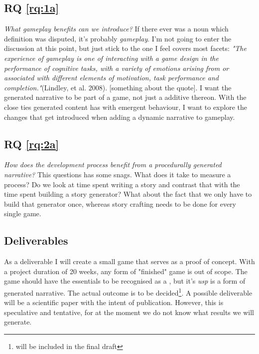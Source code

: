 \subsection{RQ \ref{rq:1a}}
\textit{What gameplay benefits can we introduce?}
If there ever was a noun which definition was disputed, it's probably \textit{gameplay}. I'm not going to enter the discussion at this point, but just stick to the one I feel covers most facets: \textit{"The experience of gameplay is one of interacting with a game design in the performance of cognitive tasks, with a variety of emotions arising from or associated with different elements of motivation, task performance and completion."}(Lindley, et al. 2008). [something about the quote].
I want the generated narrative to be part of a game, not just a additive thereon. With the close ties generated content has with emergent behaviour, I want to explore the changes that get introduced when adding a dynamic narrative to gameplay.

\subsection{RQ \ref{rq:2a}}
\textit{How does the development process benefit from a procedurally generated narrative?} This questions has some snags. What does it take to measure a process? Do we look at time spent writing a story and contrast that with the time spent building a story generator? What about the fact that we only have to build that generator once, whereas story crafting needs to be done for every single game.

\subsection{Deliverables}
As a deliverable I will create a small \rogue game that serves as a proof of concept. With a project duration of 20 weeks, any form of "finished" game is out of scope. The game should have the essentials to be recognised as a \rogue, but it's \textit{usp} is a form of generated narrative. The actual outcome is to be decided\footnote{will be included in the final draft}. A possible deliverable will be a scientific paper with the intent of publication. However, this is speculative and tentative, for at the moment we do not know what results we will generate.